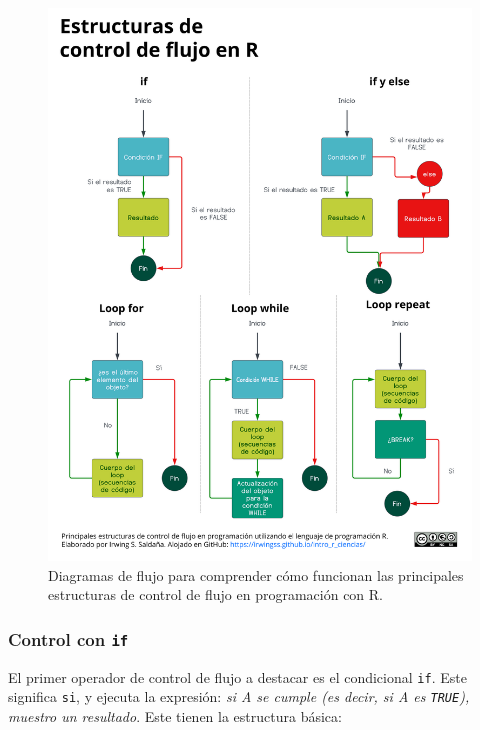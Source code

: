 \documentclass[
]{article}
\theoremstyle{definition}
\theoremstyle{definition}
\theoremstyle{definition}
\theoremstyle{definition}
\theoremstyle{remark}
\begin{document}
\begin{figure}

{\centering \includegraphics[width=1\linewidth]{figs/elaboradas/Contro de Flujo en R} 

}

\caption{Diagramas de flujo para comprender cómo funcionan las principales estructuras de control de flujo en programación con R.}\label{fig:figura65}
\end{figure}

\hypertarget{control-con-if}{%
\subsubsection{\texorpdfstring{Control con \texttt{if}}{Control con if}}\label{control-con-if}}

El primer operador de control de flujo a destacar es el condicional \texttt{if}. Este significa \texttt{si}, y ejecuta la expresión: \emph{si A se cumple (es decir, si A es \texttt{TRUE}), muestro un resultado}. Este tienen la estructura básica:
\end{document}
